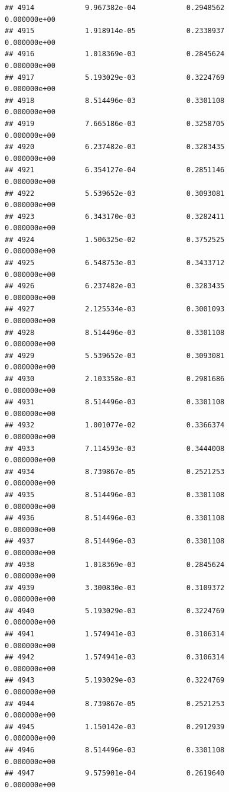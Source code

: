 \documentclass[
]{article}
\begin{document}
\begin{verbatim}
## 4914            9.967382e-04            0.2948562            0.000000e+00
## 4915            1.918914e-05            0.2338937            0.000000e+00
## 4916            1.018369e-03            0.2845624            0.000000e+00
## 4917            5.193029e-03            0.3224769            0.000000e+00
## 4918            8.514496e-03            0.3301108            0.000000e+00
## 4919            7.665186e-03            0.3258705            0.000000e+00
## 4920            6.237482e-03            0.3283435            0.000000e+00
## 4921            6.354127e-04            0.2851146            0.000000e+00
## 4922            5.539652e-03            0.3093081            0.000000e+00
## 4923            6.343170e-03            0.3282411            0.000000e+00
## 4924            1.506325e-02            0.3752525            0.000000e+00
## 4925            6.548753e-03            0.3433712            0.000000e+00
## 4926            6.237482e-03            0.3283435            0.000000e+00
## 4927            2.125534e-03            0.3001093            0.000000e+00
## 4928            8.514496e-03            0.3301108            0.000000e+00
## 4929            5.539652e-03            0.3093081            0.000000e+00
## 4930            2.103358e-03            0.2981686            0.000000e+00
## 4931            8.514496e-03            0.3301108            0.000000e+00
## 4932            1.001077e-02            0.3366374            0.000000e+00
## 4933            7.114593e-03            0.3444008            0.000000e+00
## 4934            8.739867e-05            0.2521253            0.000000e+00
## 4935            8.514496e-03            0.3301108            0.000000e+00
## 4936            8.514496e-03            0.3301108            0.000000e+00
## 4937            8.514496e-03            0.3301108            0.000000e+00
## 4938            1.018369e-03            0.2845624            0.000000e+00
## 4939            3.300830e-03            0.3109372            0.000000e+00
## 4940            5.193029e-03            0.3224769            0.000000e+00
## 4941            1.574941e-03            0.3106314            0.000000e+00
## 4942            1.574941e-03            0.3106314            0.000000e+00
## 4943            5.193029e-03            0.3224769            0.000000e+00
## 4944            8.739867e-05            0.2521253            0.000000e+00
## 4945            1.150142e-03            0.2912939            0.000000e+00
## 4946            8.514496e-03            0.3301108            0.000000e+00
## 4947            9.575901e-04            0.2619640            0.000000e+00

\end{verbatim}
\end{document}
